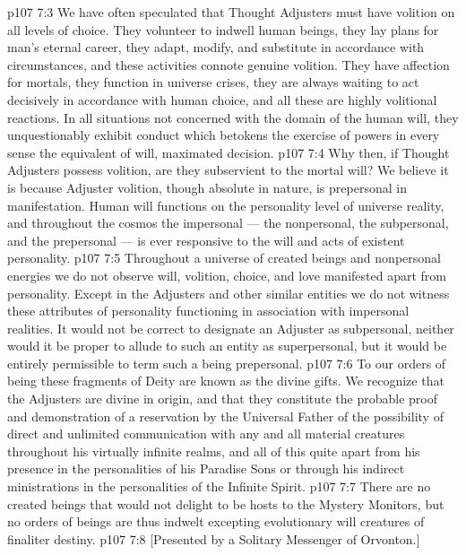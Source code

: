 \vs p107 7:3 We have often speculated that Thought Adjusters must have volition on all  levels of choice. They volunteer to indwell human beings, they lay plans for man’s eternal career, they adapt, modify, and substitute in accordance with circumstances, and these activities connote genuine volition. They have affection for mortals, they function in universe crises, they are always waiting to act decisively in accordance with human choice, and all these are highly volitional reactions. In all situations not concerned with the domain of the human will, they unquestionably exhibit conduct which betokens the exercise of powers in every sense the equivalent of will, maximated decision.
\vs p107 7:4 Why then, if Thought Adjusters possess volition, are they subservient to the mortal will? We believe it is because Adjuster volition, though absolute in nature, is prepersonal in manifestation. Human will functions on the personality level of universe reality, and throughout the cosmos the impersonal --- the nonpersonal, the subpersonal, and the prepersonal --- is ever responsive to the will and acts of existent personality.
\vs p107 7:5 Throughout a universe of created beings and nonpersonal energies we do not observe will, volition, choice, and love manifested apart from personality. Except in the Adjusters and other similar entities we do not witness these attributes of personality functioning in association with impersonal realities. It would not be correct to designate an Adjuster as subpersonal, neither would it be proper to allude to such an entity as superpersonal, but it would be entirely permissible to term such a being prepersonal.
\vs p107 7:6 \pc To our orders of being these fragments of Deity are known as the divine gifts. We recognize that the Adjusters are divine in origin, and that they constitute the probable proof and demonstration of a reservation by the Universal Father of the possibility of direct and unlimited communication with any and all material creatures throughout his virtually infinite realms, and all of this quite apart from his presence in the personalities of his Paradise Sons or through his indirect ministrations in the personalities of the Infinite Spirit.
\vs p107 7:7 There are no created beings that would not delight to be hosts to the Mystery Monitors, but no orders of beings are thus indwelt excepting evolutionary will creatures of finaliter destiny.
\vsetoff
\vs p107 7:8 [Presented by a Solitary Messenger of Orvonton.]
